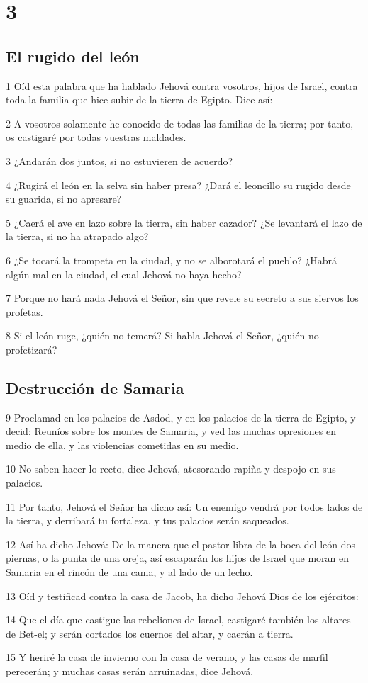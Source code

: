 \chapter{3}

\section*{El rugido del león}

\par 1 Oíd esta palabra que ha hablado Jehová contra vosotros, hijos de Israel, contra toda la familia que hice subir de la tierra de Egipto. Dice así:
\par 2 A vosotros solamente he conocido de todas las familias de la tierra; por tanto, os castigaré por todas vuestras maldades.
\par 3 ¿Andarán dos juntos, si no estuvieren de acuerdo?
\par 4 ¿Rugirá el león en la selva sin haber presa? ¿Dará el leoncillo su rugido desde su guarida, si no apresare?
\par 5 ¿Caerá el ave en lazo sobre la tierra, sin haber cazador? ¿Se levantará el lazo de la tierra, si no ha atrapado algo?
\par 6 ¿Se tocará la trompeta en la ciudad, y no se alborotará el pueblo? ¿Habrá algún mal en la ciudad, el cual Jehová no haya hecho?
\par 7 Porque no hará nada Jehová el Señor, sin que revele su secreto a sus siervos los profetas.
\par 8 Si el león ruge, ¿quién no temerá? Si habla Jehová el Señor, ¿quién no profetizará?

\section*{Destrucción de Samaria}

\par 9 Proclamad en los palacios de Asdod, y en los palacios de la tierra de Egipto, y decid: Reuníos sobre los montes de Samaria, y ved las muchas opresiones en medio de ella, y las violencias cometidas en su medio.
\par 10 No saben hacer lo recto, dice Jehová, atesorando rapiña y despojo en sus palacios.
\par 11 Por tanto, Jehová el Señor ha dicho así: Un enemigo vendrá por todos lados de la tierra, y derribará tu fortaleza, y tus palacios serán saqueados.
\par 12 Así ha dicho Jehová: De la manera que el pastor libra de la boca del león dos piernas, o la punta de una oreja, así escaparán los hijos de Israel que moran en Samaria en el rincón de una cama, y al lado de un lecho.
\par 13 Oíd y testificad contra la casa de Jacob, ha dicho Jehová Dios de los ejércitos:
\par 14 Que el día que castigue las rebeliones de Israel, castigaré también los altares de Bet-el; y serán cortados los cuernos del altar, y caerán a tierra.
\par 15 Y heriré la casa de invierno con la casa de verano, y las casas de marfil perecerán; y muchas casas serán arruinadas, dice Jehová.

